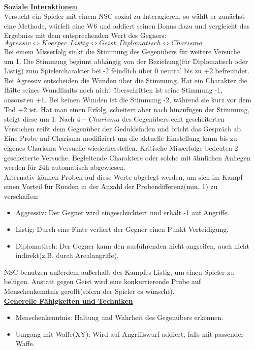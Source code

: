 \documentclass[twoside,a4paper]{minimal}
\begin{document}
\begin{multicols*}{3}
\textbf{\uline{\\Soziale Interaktionen}}
\\Versucht ein Spieler mit einem NSC sozial zu Interagieren, so wählt er zunächst eine Methode, würfelt eine W6 und addiert seinen Bonus dazu und vergleicht das Ergebniss mit dem entsprechenden Wert des Gegners:
\\$Agressiv\iff Koerper,Listig\iff Geist,Diplomatisch\iff Charisma$
\\Bei einem Misserfolg sinkt die Stimmung des Gegenübers für weitere Versuche um 1. Die Stimmung beginnt abhängig von der Beziehung(für Diplomatisch oder Listig) zum Spielercharakter bei -2 feindlich über 0 neutral bis zu +2 befreundet. Bei Agressiv entscheiden die Wunden über die Stimmung. Hat ein Charakter die Hälte seines Wundlimits noch nicht überschritten ist seine Stimmung -1, ansonsten +1. Bei keinen Wunden ist die Stimmung -2, während sie kurz vor dem Tod +2 ist. Hat man einen Erfolg, scheitert aber nach hinzufügen der Stimmung, steigt diese um 1. Nach $4-Charisma$ des Gegenübers echt gescheiterten Versuchen reißt dem Gegenüber der Geduldsfaden und bricht das Gespräch ab. Eine Probe auf Charisma modifiziert um die aktuelle Einstellung kann bis zu eigenes Charisma Versuche wiederherstellen. Kritische Misserfolge bedeuten 2 gescheiterte Versuche. Begleitende Charaktere oder solche mit ähnlichen Anliegen werden für 24h automatisch abgewiesen.
\\Alternativ können Proben auf diese Werte abgelegt werden, um sich im Kampf einen Vorteil für Runden in der Anzahl der Probendifferenz(min. 1) zu verschaffen:
\begin{itemize}
\item Aggressiv: Der Gegner wird eingeschüchtert und erhält -1 auf Angriffe.
\item Listig: Durch eine Finte verliert der Gegner einen Punkt Verteidigung.
\item Diplomatisch: Der Gegner kann den ausführenden nicht angreifen, auch nicht indirekt(z.B. durch Arealangriffe).
\end{itemize}
NSC benutzen außerdem außerhalb des Kampfes Listig, um einen Spieler zu belügen. Anstatt gegen Geist wird eine konkurrierende Probe auf Menschenkenntnis gerollt(sofern der Spieler es wünscht).
\textbf{\uline{\\Generelle Fähigkeiten und Techniken}}
\begin{itemize}
\item Menschenkenntnis: Haltung und Wahrheit des Gegenübers erkennen.
\item Umgang mit Waffe(XY): Wird auf Angriffswurf addiert, falls mit passender Waffe.

\end{itemize}
\end{multicols*}
\end{document}
